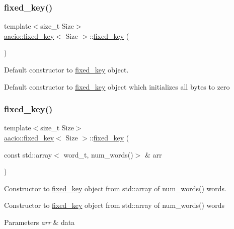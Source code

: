 \subsubsection{\texorpdfstring{fixed\+\_\+key()}{fixed\_key()}\hspace{0.1cm}{\footnotesize\ttfamily [1/4]}}
{\footnotesize\ttfamily template$<$size\+\_\+t Size$>$ \\
\mbox{\hyperlink{classaacio_1_1fixed__key}{aacio\+::fixed\+\_\+key}}$<$ Size $>$\+::\mbox{\hyperlink{classaacio_1_1fixed__key}{fixed\+\_\+key}} (\begin{DoxyParamCaption}{ }\end{DoxyParamCaption})\hspace{0.3cm}{\ttfamily [inline]}}



Default constructor to \mbox{\hyperlink{classaacio_1_1fixed__key}{fixed\+\_\+key}} object. 

Default constructor to \mbox{\hyperlink{classaacio_1_1fixed__key}{fixed\+\_\+key}} object which initializes all bytes to zero \mbox{\label{classaacio_1_1fixed__key_a8b7e40b2f57b0d95ed19e32a52b6abd9}} 
\subsubsection{\texorpdfstring{fixed\+\_\+key()}{fixed\_key()}\hspace{0.1cm}{\footnotesize\ttfamily [2/4]}}
{\footnotesize\ttfamily template$<$size\+\_\+t Size$>$ \\
\mbox{\hyperlink{classaacio_1_1fixed__key}{aacio\+::fixed\+\_\+key}}$<$ Size $>$\+::\mbox{\hyperlink{classaacio_1_1fixed__key}{fixed\+\_\+key}} (\begin{DoxyParamCaption}\item[{const std\+::array$<$ word\+\_\+t, num\+\_\+words()$>$ \&}]{arr }\end{DoxyParamCaption})\hspace{0.3cm}{\ttfamily [inline]}}



Constructor to \mbox{\hyperlink{classaacio_1_1fixed__key}{fixed\+\_\+key}} object from std\+::array of num\+\_\+words() words. 

Constructor to \mbox{\hyperlink{classaacio_1_1fixed__key}{fixed\+\_\+key}} object from std\+::array of num\+\_\+words() words 
\begin{DoxyParams}{Parameters}
{\em arr} & data \\
\hline
\end{DoxyParams}
\mbox{\label{classaacio_1_1fixed__key_a08beebc009535d8dd7390841d0582ee6}} 
